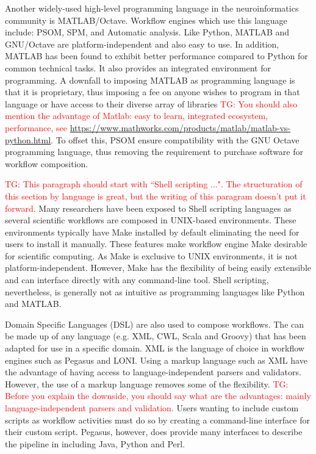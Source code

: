 \documentclass{report}
\newcommand{\tristan}[1]{\textcolor{red}{TG: #1}}
\begin{document}
            Another widely-used high-level programming language in the 
            neuroinformatics community is MATLAB/Octave. Workflow engines which
            use this language include: PSOM, SPM, and Automatic analysis. Like 
            Python, MATLAB and GNU/Octave are platform-independent and also easy to use. In addition, MATLAB has 
            been found to exhibit better performance compared to Python for 
            common technical tasks. It also provides an integrated environment
            for programming. A 
            downfall to imposing MATLAB as programming language is that it is proprietary, thus imposing a fee on 
            anyone wishes to program in that language or have access to their diverse array of libraries \tristan{You should also mention the
            advantage of Matlab: easy to learn, integrated ecosystem, 
            performance, see 
            \url{https://www.mathworks.com/products/matlab/matlab-vs-python.html}}. 
            To offset this, PSOM ensure compatibility with the GNU 
            Octave programming language, thus 
            removing the requirement to purchase software for workflow 
            composition. 

            \tristan{This paragraph should start with ``Shell scripting ...". The structuration of this section by language
            is great, but the writing of this paragram doesn't put it forward.}
            Many researchers have been exposed to Shell scripting languages as 
            several scientific workflows are composed in UNIX-based 
            environments. These environments typically have Make installed by
            default eliminating the need for users to install it manually.
            These features make workflow engine Make desirable for scientific
            computing.
            As Make is exclusive to UNIX environments, it is not 
            platform-independent. However, Make has the flexibility of being
            easily extensible and can interface directly with any command-line
            tool. Shell scripting, nevertheless, is generally not as intuitive
            as programming languages like Python and MATLAB.

            Domain Specific Languages (DSL) are also used to compose workflows.
            The can be made up of any language (e.g. XML, CWL, Scala and Groovy) that has been adapted for use in 
            a specific domain.
            XML is the language of choice in  
            workflow engines such as Pegasus and LONI. Using a markup language
            such as XML have the advantage of having access to 
            language-independent parsers and validators. However, the use of a 
            markup language removes some of the flexibility. \tristan{Before you explain the downside, 
            you should say what are the advantages: mainly language-independent parsers and validation.} Users wanting to 
            include 
            custom scripts as workflow activities must do so by creating a 
            command-line interface for their custom script. Pegasus, however,
            does provide many interfaces to describe the pipeline in including
            Java, Python and Perl.
\end{document}
